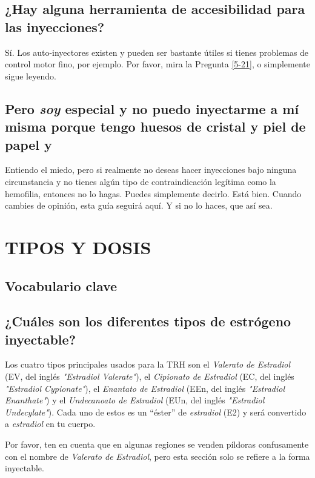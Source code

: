 \documentclass{article}
\begin{document}
\subsection{¿Hay alguna herramienta de accesibilidad para las inyecciones?}

Sí. Los auto-inyectores existen y pueden ser bastante útiles si tienes problemas de control motor fino, por ejemplo. Por favor, mira la Pregunta \ref{5-21}, o simplemente sigue leyendo.

\subsection{Pero \textit{soy} especial y no puedo inyectarme a mí misma porque tengo huesos de cristal y piel de papel y\textemdash{}}

Entiendo el miedo, pero si realmente no deseas hacer inyecciones bajo ninguna circunstancia y no tienes algún tipo de contraindicación legítima como la hemofilia, entonces no lo hagas. Puedes simplemente decirlo. Está bien. Cuando cambies de opinión, esta guía seguirá aquí. Y si no lo haces, que así sea.



\section{TIPOS Y DOSIS}\label{td}

\subsection*{Vocabulario clave}

\subsection{¿Cuáles son los diferentes tipos de estrógeno inyectable?}

Los cuatro tipos principales usados para la TRH son el \textit{Valerato de Estradiol} (EV, del inglés \textit{"Estradiol Valerate"}), el \textit{Cipionato de Estradiol} (EC, del inglés \textit{"Estradiol Cypionate"}), el \textit{Enantato de Estradiol} (EEn, del inglés \textit{"Estradiol Enanthate"}) y el \textit{Undecanoato de Estradiol} (EUn, del inglés \textit{"Estradiol Undecylate"}). Cada uno de estos es un “éster” de \textit{estradiol} (E2) y será convertido a \textit{estradiol} en tu cuerpo.

Por favor, ten en cuenta que en algunas regiones se venden píldoras confusamente con el nombre de \textit{Valerato de Estradiol}, pero esta sección solo se refiere a la forma inyectable.
\end{document}
